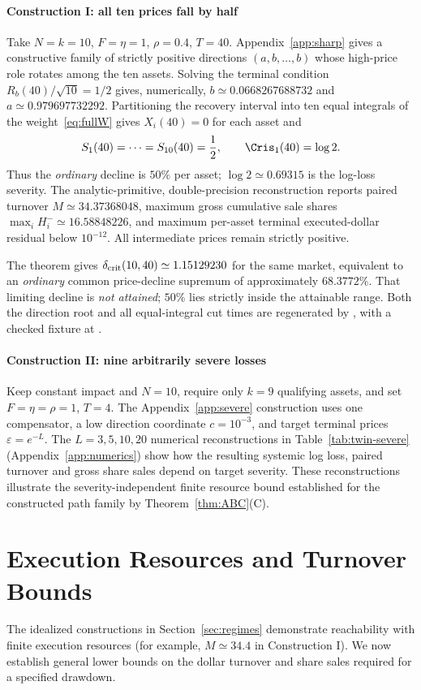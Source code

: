 \documentclass[review,hidelinks,onefignum,onetabnum]{siamonline250211}
\begin{document}
\paragraph{Construction I: all ten prices fall by half}
Take $N=k=10$, $F=\eta=1$, $\rho=0.4$, $T=40$.
Appendix~\ref{app:sharp} gives a constructive family of strictly
positive directions $(a,b,\ldots,b)$ whose high-price role rotates
among the ten assets. Solving the terminal condition
$R_b(40)/\sqrt{10}=1/2$ gives, numerically,
$b\simeq0.0668267688732$ and $a\simeq0.979697732292$.
Partitioning the recovery interval into ten equal
integrals of the weight~\eqref{eq:fullW} gives
$X_i(40)=0$ for each asset and
\[
S_1(40)=\cdots=S_{10}(40)=\frac12,\qquad
\Cris_1(40)=\log2.
\]
Thus the \emph{ordinary} decline is $50\%$ per asset;
$\log2\simeq0.69315$ is the log-loss severity. The
analytic-primitive, double-precision reconstruction reports
paired turnover $M\simeq34.37368048$, maximum gross
cumulative sale shares $\max_iH_i^-\simeq16.58848226$,
and maximum per-asset terminal executed-dollar residual
below $10^{-12}$. All intermediate prices remain strictly positive.

The theorem gives
$\delta_{\rm crit}(10,40)\simeq1.15129230$ for the same
market, equivalent to an \emph{ordinary} common price-decline
supremum of approximately $68.3772\%$. That limiting
decline is \emph{not attained}; $50\%$ lies strictly
inside the attainable range. Both the direction root
and all equal-integral cut times are regenerated by
,
with a checked fixture at
.

\paragraph{Construction II: nine arbitrarily severe losses}
Keep constant impact and $N=10$, require only $k=9$
qualifying assets, and set $F=\eta=\rho=1$, $T=4$.
The Appendix~\ref{app:severe} construction uses one
compensator, a low direction coordinate $c=10^{-3}$,
and target terminal prices $\varepsilon=e^{-L}$.
The $L=3,5,10,20$ numerical reconstructions in
Table~\ref{tab:twin-severe} (Appendix~\ref{app:numerics})
show how the resulting systemic log loss, paired
turnover and gross share sales depend on target severity.
These reconstructions illustrate the severity-independent
finite resource bound established for the constructed path
family by Theorem~\ref{thm:ABC}(C).

\section{Execution Resources and Turnover Bounds}\label{sec:budget}
The idealized constructions in Section~\ref{sec:regimes} demonstrate
reachability with finite execution resources (for example,
$M\simeq34.4$ in Construction I). We now establish general lower bounds on the
dollar turnover and share sales required for a specified drawdown.
\end{document}
